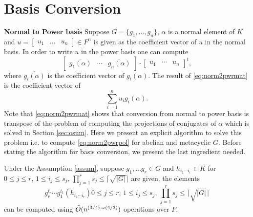 \section{Basis Conversion}\label{sec:conversion}

\textbf{Normal to Power basis}
Suppose $G = \lbrace g_1, \ldots, g_n \rbrace$, $\alpha$ is a normal element of $K$ and $u = \begin{bmatrix}u_1 & \ldots & u_n \end{bmatrix} \in F^n$ is given as the coefficient vector of $u$ in the normal basis.
In order to write $u $ in the power basis one can compute 
\begin{equation}\label{eq:norm2pwrmat}
\left[\begin{array}{c|c|c}
\overline{g_1(\alpha)} & \cdots & \overline{g_n(\alpha)} 
\end{array}\right]\cdot 
\begin{bmatrix}
u_1 & \cdots & u_n
\end{bmatrix}^t,
\end{equation}
where $\overline{g_i(\alpha)}$ is the coefficient vector of $g_i(\alpha)$. The result of \eqref{eq:norm2pwrmat} is the coefficient vector of
\begin{equation}\label{eq:norm2pwrpol}
\sum_{i = 1}^n u_i g_i(\alpha).
\end{equation}
Note that \eqref{eq:norm2pwrmat} shows that conversion from normal to power basis is transpose of the problem of computing the projections of 
conjugates of $\alpha$ which is solved in Section \ref{sec:osum}. Here we present an explicit algorithm to solve this problem i.e. to compute
\eqref{eq:norm2pwrpol} for abelian and metacyclic $G$. Before stating the algorithm for basis conversion, we present the last
ingredient needed. 

\begin{lemma}\label{lem:hornerrep}
Under the Assumption \ref{assum}, suppose $g_1, \ldots g_r \in G$ and $h_{i_1 \cdots i_r} \in K$ for $0 \leq j \leq r, \, 
1 \leq i_j \leq s_j, \, \prod_{j = 1}^r s_j \leq  \lceil \sqrt{\vert G \vert} \rceil $ are given. the elements 
$$g_r^{i_r}\cdots g_1^{i_1}(h_{i_1 \cdots i_r}) 0 \leq j \leq r, \, 
1 \leq i_j \leq s_j, \, \prod_{j = 1}^r s_j \leq  \lceil \sqrt{\vert G \vert} \rceil $$
can be computed using $\tilde{O}(n^{(3/4)\cdot \omega(4/3)})$ operations over $F$.
\end{lemma}

